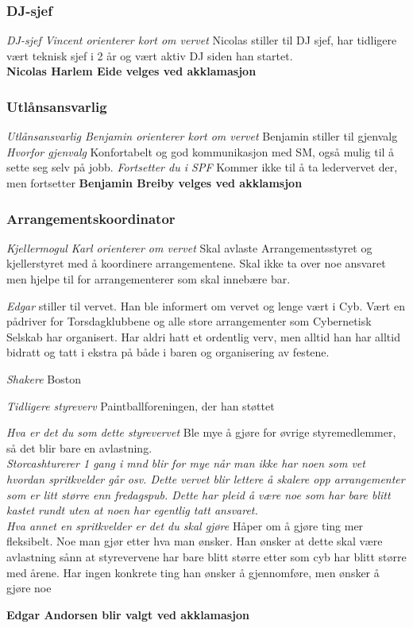 \documentclass[10pt,norsk,a4paper]{article}
\begin{document}
\begin{multicols}{2}
\subsubsection{DJ-sjef}
\textit{DJ-sjef Vincent orienterer kort om vervet}
Nicolas stiller til DJ sjef, har tidligere vært teknisk sjef i 2 år og vært
aktiv DJ siden han startet. \\
\textbf{Nicolas Harlem Eide velges ved akklamasjon}

\subsubsection{Utlånsansvarlig}
\textit{Utlånsansvarlig Benjamin orienterer kort om vervet}
Benjamin stiller til gjenvalg\\
\textit{Hvorfor gjenvalg}
Konfortabelt og god kommunikasjon med SM, også mulig til å sette seg selv på
jobb.
\textit{Fortsetter du i SPF}
Kommer ikke til å ta ledervervet der, men fortsetter 
\textbf{Benjamin Breiby velges ved akklamsjon}

\newpage
\subsubsection{Arrangementskoordinator\footnotemark}
\textit{Kjellermogul Karl orienterer om vervet}
Skal avlaste Arrangementsstyret og kjellerstyret med å koordinere
arrangementene. Skal ikke ta over noe ansvaret men hjelpe til for
arrangementerer som skal innebære bar.

\textit{Edgar} stiller til vervet. Han ble informert om vervet og lenge vært i Cyb. Vært en pådriver for
Torsdagklubbene og alle store arrangementer som Cybernetisk Selskab har organisert. Har
aldri hatt et ordentlig verv, men alltid han har alltid bidratt og tatt i
ekstra på både i baren og organisering av festene.

\textit{Shakere}
Boston

\textit{Tidligere styreverv}
Paintballforeningen, der han støttet

\textit{Hva er det du som dette styrevervet}
Ble mye å gjøre for øvrige styremedlemmer, så det blir bare en avlastning.\\

\textit{Storcashturerer 1 gang i mnd blir for mye når man ikke har noen som vet
hvordan spritkvelder går osv. Dette vervet blir lettere å skalere opp
arrangementer som er litt større enn fredagspub. Dette har pleid å være noe
som har bare blitt kastet rundt uten at noen har egentlig tatt ansvaret.}\\

\textit{Hva annet en spritkvelder er det du skal gjøre}
Håper om å gjøre ting mer fleksibelt. Noe man gjør etter hva man ønsker. Han
ønsker at dette skal være avlastning sånn at styrevervene har bare blitt
større etter som cyb har blitt større med årene.
Har ingen konkrete ting han ønsker å gjennomføre, men ønsker å gjøre noe

\textbf{Edgar Andorsen blir valgt ved akklamasjon}

\end{multicols}
\end{document}
